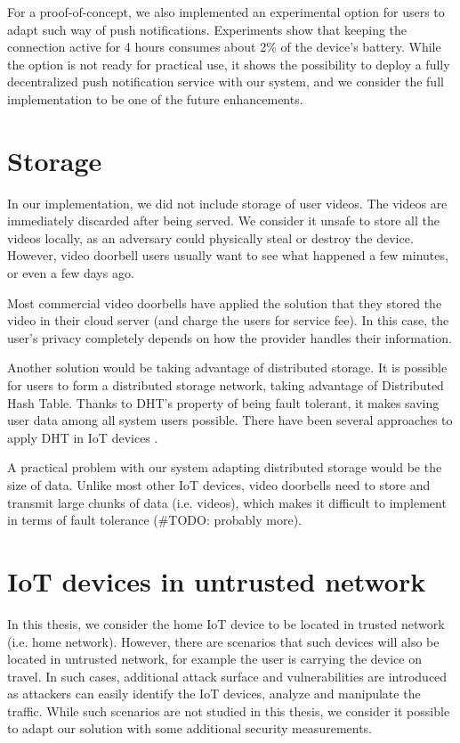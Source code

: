 For a proof-of-concept, we also implemented an experimental option for users to adapt such way of push notifications. Experiments show that keeping the connection active for 4 hours consumes about 2\% of the device's battery. While the option is not ready for practical use, it shows the possibility to deploy a fully decentralized push notification service with our system, and we consider the full implementation to be one of the future enhancements.

\section{Storage}
In our implementation, we did not include storage of user videos. The videos are immediately discarded after being served. We consider it unsafe to store all the videos locally, as an adversary could physically steal or destroy the device. However, video doorbell users usually want to see what happened a few minutes, or even a few days ago.

Most commercial video doorbells have applied the solution that they stored the video in their cloud server (and charge the users for service fee). In this case, the user's privacy completely depends on how the provider handles their information.

Another solution would be taking advantage of distributed storage. It is possible for users to form a distributed storage network, taking advantage of Distributed Hash Table. Thanks to DHT's property of being fault tolerant, it makes saving user data among all system users possible. There have been several approaches to apply DHT in IoT devices \cite{fabian2014privacy} \cite{paganelli2012dht}.

A practical problem with our system adapting distributed storage would be the size of data. Unlike most other IoT devices, video doorbells need to store and transmit large chunks of data (i.e. videos), which makes it difficult to implement in terms of fault tolerance (\#TODO: probably more).


\section{IoT devices in untrusted network}
In this thesis, we consider the home IoT device to be located in trusted network (i.e. home network). However, there are scenarios that such devices will also be located in untrusted network, for example the user is carrying the device on travel. In such cases, additional attack surface and vulnerabilities are introduced as attackers can easily identify the IoT devices, analyze and manipulate the traffic. While such scenarios are not studied in this thesis, we consider it possible to adapt our solution with some additional security measurements. 

